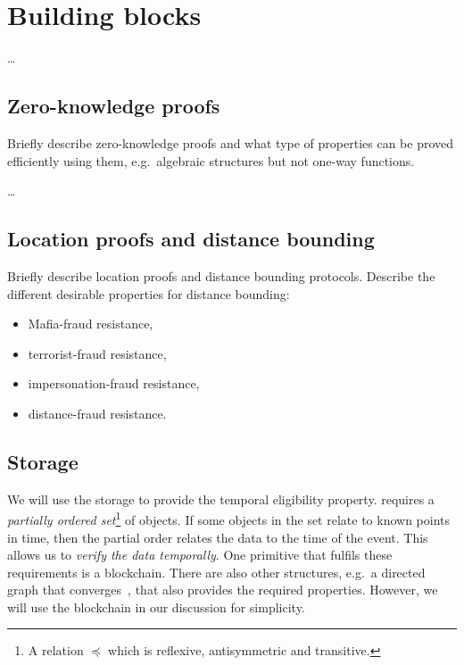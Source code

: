 \section{Building blocks}%
\label{Primitives}\label{BuildingBlocks}

\dots

\subsection{Zero-knowledge proofs}

Briefly describe zero-knowledge proofs and what type of properties can be proved 
efficiently using them, e.g.\ algebraic structures but not one-way functions.

\dots

\subsection{Location proofs and distance bounding}

Briefly describe location proofs and distance bounding protocols.
Describe the different desirable properties for distance bounding:
\begin{itemize}
  \item Mafia-fraud resistance,
  \item terrorist-fraud resistance,
  \item impersonation-fraud resistance,
  \item distance-fraud resistance.
\end{itemize}

\subsection{Storage}%
\label{StorageProperties}

We will use the storage to provide the temporal eligibility property.
 requires a \emph{partially ordered 
  set}\footnote{%
  A relation \(\preceq\) which is reflexive, antisymmetric and transitive.
} of objects.
If some objects in the set relate to known points in time, then the partial 
order relates the data to the time of the event.
This allows us to \emph{verify the data temporally}.
One primitive that fulfils these requirements is a blockchain.
There are also other structures, e.g.\ a directed graph that 
converges~\cite{BlockchainFreeCryptocurrencies}, that also provides the required 
properties.
However, we will use the blockchain in our discussion for simplicity.

